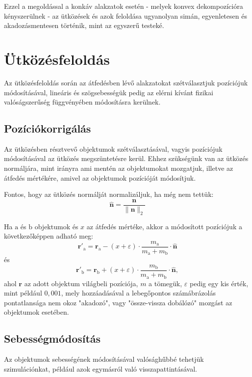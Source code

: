 \documentclass[12pt]{report}
\begin{document}
Ezzel a megoldással a konkáv alakzatok esetén - melyek konvex dekompozícióra kényszerülnek - az ütközések és azok feloldása ugyanolyan simán, egyenletesen és akadozásmentesen történik, mint az egyszerű testeké.

\newpage
\section{Ütközésfeloldás}

Az ütközésfeloldás során az átfedésben lévő alakzatokat szétválasztjuk pozíciójuk módosításával, lineáris és szögsebességük pedig az elérni kívánt fizikai valóságszerűség függvényében módosításra kerülnek.

\subsection{Pozíciókorrigálás}

Az ütközésben résztvevő objektumok szétválasztásával, vagyis pozíciójuk módosításával az ütközés megszüntetésre kerül. Ehhez szükségünk van az ütközés normáljára, mint irányra ami mentén az objektumokat mozgatjuk, illetve az átfedés mértékére, amivel az objektumok pozícióját módosítjuk.

Fontos, hogy az ütközés normálját normalizáljuk, ha még nem tettük:
\[
    \hat{\mathbf{n}} = \frac{\mathbf{n}}{\|\mathbf{n}\|_2}
\]

Ha $\text{a}$ és $\text{b}$ objektumok és $x$ az átfedés mértéke, akkor a módosított pozíciójuk a következőképpen adható meg:
\[
    \mathbf{r'}_{\text{a}} = \mathbf{r}_{\text{a}} - (x + \varepsilon) \cdot \frac{m_{\text{a}}}{m_{\text{a}} + m_{\text{b}}} \cdot \hat{\mathbf{n}}
\]
és
\[
    \mathbf{r'}_{\text{b}} = \mathbf{r}_{\text{b}} + (x + \varepsilon) \cdot \frac{m_{\text{b}}}{m_{\text{a}} + m_{\text{b}}} \cdot \hat{\mathbf{n}},
\]
ahol $\mathbf{r}$ az adott objektum világbeli pozíciója, $m$ a tömegük, $\varepsilon$ pedig egy kis érték, mint például $0,001$, mely hozzáadásával a lebegőpontos számábrázolás pontatlansága nem okoz "akadozó", vagy "össze-vissza dobálózó" mozgást az objektumok esetében.

\subsection{Sebességmódosítás}

Az objektumok sebességének módosításával valósághűbbé tehetjük szimulációnkat, például azok egymásról való visszapattintásával.
\end{document}
